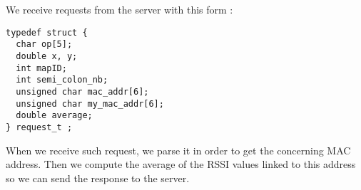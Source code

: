 We receive requests from the server with this form :

\begin{lstlisting}
typedef struct {
  char op[5];
  double x, y;
  int mapID;
  int semi_colon_nb;
  unsigned char mac_addr[6];
  unsigned char my_mac_addr[6];
  double average;
} request_t ;
\end{lstlisting}

When we receive such request, we parse it in order to get the concerning MAC
address. Then we compute the average of the RSSI values linked to this address
so we can send the response to the server.








